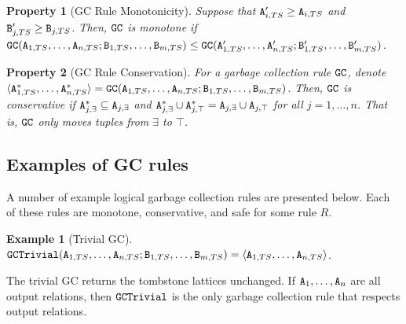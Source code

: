 \documentclass{article}
\numberwithin{equation}{section}
\newtheorem{example}{Example}[section]
\newtheorem{property}{Property}[section]
\renewcommand{\tt}[1]{\ifmmode\text{\texttt{#1}}\else\texttt{#1}\fi}
\begin{document}
\begin{property}[GC Rule Monotonicity]
Suppose that $\tt{A}'_{i,TS} \geq \tt{A}_{i,TS}$ and $\tt{B}'_{j,TS} \geq \tt{B}_{j,TS}$.
Then, $\tt{GC}$ is \emph{monotone} if $\tt{GC}(\tt{A}_{1,TS}, \dots, \tt{A}_{n,TS}; \tt{B}_{1,TS}, \dots, \tt{B}_{m,TS}) \leq \tt{GC}(\tt{A}'_{1,TS}, \dots, \tt{A}'_{n,TS}; \tt{B}'_{1,TS}, \dots, \tt{B}'_{m,TS})$.
\end{property}

\begin{property}[GC Rule Conservation]
\label{property:gc_conservative}
For a garbage collection rule $\tt{GC}$, denote
$\langle \tt{A}_{1,TS}^*, \dots, \tt{A}_{n,TS}^* \rangle = \tt{GC}(\tt{A}_{1,TS}, \dots, \tt{A}_{n,TS}; \tt{B}_{1,TS}, \dots, \tt{B}_{m,TS})$.
Then, $\tt{GC}$ is \emph{conservative} if $\tt{A}_{j,\exists}^* \subseteq \tt{A}_{j,\exists}$ and $\tt{A}_{j,\exists}^* \cup \tt{A}_{j,\top}^* = \tt{A}_{j,\exists} \cup \tt{A}_{j,\top}$ for all $j=1,\dots,n$.
That is, $\tt{GC}$ only moves tuples from $\exists$ to $\top$.
\end{property}

\subsection{Examples of GC rules}
\label{sec:logical:example}
A number of example logical garbage collection rules are presented below.
Each of these rules are monotone, conservative, and safe for some rule $R$.
\begin{example}[Trivial GC]
$\tt{GCTrivial}(\tt{A}_{1,TS}, \dots, \tt{A}_{n,TS}; \tt{B}_{1,TS}, \dots, \tt{B}_{m,TS}) = \langle \tt{A}_{1,TS}, \dots, \tt{A}_{n,TS} \rangle$.
\end{example}
The trivial GC returns the tombstone lattices unchanged.
If $\tt{A}_1, \dots, \tt{A}_n$ are all output relations, then $\tt{GCTrivial}$ is the only garbage collection rule that respects output relations.
\end{document}
